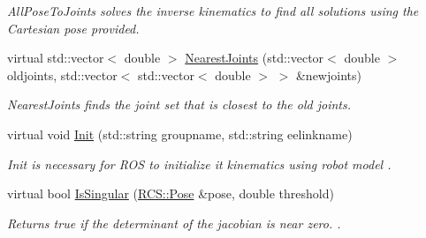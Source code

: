 \begin{DoxyCompactItemize}
\begin{DoxyCompactList}\small\item\em All\-Pose\-To\-Joints solves the inverse kinematics to find all solutions using the Cartesian pose provided. \end{DoxyCompactList}\item 
virtual std\-::vector$<$ double $>$ \hyperlink{classMoveitKinematics_acd060eacf93c71b0cfb61bd5c93ceb77}{Nearest\-Joints} (std\-::vector$<$ double $>$ oldjoints, std\-::vector$<$ std\-::vector$<$ double $>$ $>$ \&newjoints)
\begin{DoxyCompactList}\small\item\em Nearest\-Joints finds the joint set that is closest to the old joints. \end{DoxyCompactList}\item 
virtual void \hyperlink{classMoveitKinematics_a3d0a3d9eadca26b5a24dd9904fee6e91}{Init} (std\-::string groupname, std\-::string eelinkname)
\begin{DoxyCompactList}\small\item\em Init is necessary for R\-O\-S to initialize it kinematics using robot model . \end{DoxyCompactList}\item 
virtual bool \hyperlink{classMoveitKinematics_a4b8520158eba774aefc8894febe6e1d7}{Is\-Singular} (\hyperlink{namespaceRCS_aa07e45d8a50e30064283d2b38087f999}{R\-C\-S\-::\-Pose} \&pose, double threshold)
\begin{DoxyCompactList}\small\item\em Returns true if the determinant of the jacobian is near zero. . \end{DoxyCompactList}\end{DoxyCompactItemize}
